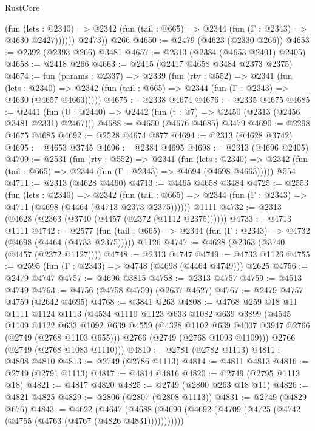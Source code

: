 \begin{lexlean}{RustCore}
\begin{coremodule}
              (fun (lets : @2340) =>
              @2342 (fun (tail : @665) => @2344 (fun (Γ : @2343) => @4630 @2427))))))
        @2473))
    @266
@4650 := @2479 (@4623 (@2330 @266))
@4653 := @2392 (@2393 @266) @3481
@4657 := @2313 (@2384 (@4653 @2401) @2405)
@4658 := @2418 @266
@4663 := @2415 (@2417 @4658 @3484 @2373 @2375)
@4674 := fun (params : @2337) =>
  @2339
    (fun (rty : @552) =>
    @2341
      (fun (lets : @2340) =>
      @2342 (fun (tail : @665) => @2344 (fun (Γ : @2343) => @4630 (@4657 @4663)))))
@4675 := @2338 @4674
@4676 := @2335 @4675
@4685 := @2441 (fun (U : @2440) => @2442 (fun (t : @7) => @2450 (@2313 (@2456 @3481 @2331) @2467)))
@4688 := @4650 (@4676 @4685) @3479
@4690 := @2298 @4675 @4685
@4692 := @2528 @4674 @877
@4694 := @2313 (@4628 @3742)
@4695 := @4653 @3745
@4696 := @2384 @4695
@4698 := @2313 (@4696 @2405)
@4709 := @2531
    (fun (rty : @552) =>
    @2341
      (fun (lets : @2340) =>
      @2342 (fun (tail : @665) => @2344 (fun (Γ : @2343) => @4694 (@4698 @4663)))))
    @554
@4711 := @2313 (@4628 @4460)
@4713 := @4465 @4658 @3484
@4725 := @2553
    (fun (lets : @2340) =>
    @2342
      (fun (tail : @665) => @2344 (fun (Γ : @2343) => @4711 (@4698 (@4464 (@4713 @2373 @2375))))))
    @1111
@4732 := @2313 (@4628 (@2363 (@3740 (@4457 (@2372 (@1112 @2375))))))
@4733 := @4713 @1111
@4742 := @2577
    (fun (tail : @665) => @2344 (fun (Γ : @2343) => @4732 (@4698 (@4464 (@4733 @2375)))))
    @1126
@4747 := @4628 (@2363 (@3740 (@4457 (@2372 @1127))))
@4748 := @2313 @4747
@4749 := @4733 @1126
@4755 := @2595 (fun (Γ : @2343) => @4748 (@4698 (@4464 @4749))) @2625
@4756 := @2479 @4747
@4757 := @4696 @3815
@4758 := @2313 @4757
@4759 := @4513 @4749
@4763 := @4756 (@4758 @4759) (@2637 @4627)
@4767 := @2479 @4757 @4759 (@2642 @4695)
@4768 := @3841 @263
@4808 := @4768
    @259
    @18
    @11
    @1111
    @1124
    @1113
    (@4534
      @1110
      @1123
      @633
      @1082
      @639
      @3899
      (@4545
        @1109
        @1122
        @633
        @1092
        @639
        @4559
        (@4328 @1102 @639 @4007 @3947 @2766 (@2749 (@2768 @1103 @655)))
        @2766
        (@2749 (@2768 @1093 @1109)))
      @2766
      (@2749 (@2768 @1083 @1110)))
@4810 := @2781 (@2782 @1113)
@4811 := @4808 @4810
@4813 := @2749 (@2786 @1113)
@4814 := @4811 @4813
@4816 := @2749 (@2791 @1113)
@4817 := @4814 @4816
@4820 := @2749 (@2795 @1113 @18)
@4821 := @4817 @4820
@4825 := @2749 (@2800 @263 @18 @11)
@4826 := @4821 @4825
@4829 := @2806 (@2807 (@2808 @1113))
@4831 := @2749 (@4829 @676)
@4843 := @4622
    (@4647 (@4688 (@4690 (@4692 (@4709 (@4725 (@4742 (@4755 (@4763 (@4767 (@4826 @4831)))))))))))

\end{coremodule}
\end{lexlean}
